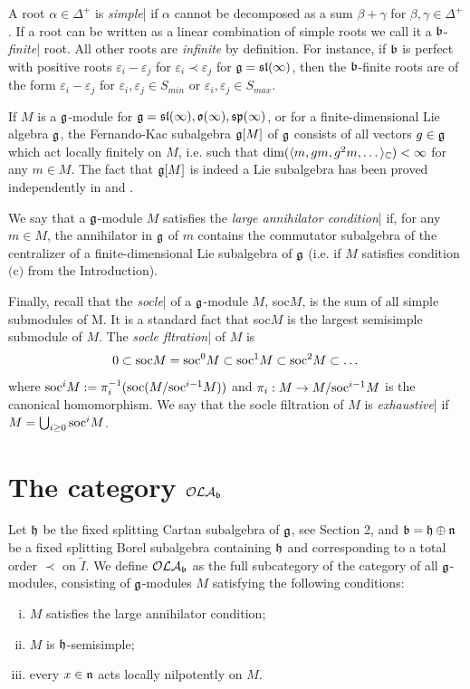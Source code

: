 \documentclass[12pt]{amsart}
\makeatletter
\def\mathbb{\Bbb}
\def\mathfrak{\frak}
\def\emph#1{{\em #1}}
\def\mathcal{\cal}
\def\@putname#1#2#3#4{\def\@@ref{#3}\let\old@bf\bf
        \def\bf##1{\old@bf\if?\noexpand##1?{#4}\else##1\fi}%
        #1{#2}%
        \let\bf\old@bf}
\def\@putname#1#2#3#4{\def\@@ref{#3}\let\old@bf\bf    %
        \let\old@reset@font\reset@font                  %
        \def\bf##1{\old@bf\if?\noexpand##1?{#4}\else##1\fi}%
        \def\reset@font##1##2{\old@reset@font##1\if?\noexpand##2?{#4}\else##2\fi}#1{#2}%
        \let\bf\old@bf\let\reset@font\old@reset@font}
\let\my@cite=\cite
\def\cite#1{\@putname\my@cite{#1}{\@citeb}{\tiny\rm\@@ref}}
\theoremstyle{plain} %
\let\emphOrig\emph
\def\eatToBar#1|{}
\def\emphToIndexSLASH#1\/{\index{#1}\eatToBar}
\def\emphToIndexDOTSLASH#1.\/{\emphToIndexSLASH #1\/}
\def\emphAndIndex#1{\emphOrig{#1}{\emphToIndexDOTSLASH #1.\/|}}
\let\emph\emphAndIndex
\numberwithin{equation}{section}
\theoremstyle{definition}
\theoremstyle{remark}
\theoremstyle{plain} %
\newcommand{\fg}{\mathfrak{g}}
\newcommand{\fn}{\mathfrak{n}}
\newcommand{\fb}{\mathfrak{b}}
\newcommand{\fh}{\mathfrak{h}}
\makeatother
\begin{document}
A root $\alpha \in \Delta^+$ is \emph{simple} if $\alpha$ cannot be decomposed as a sum $\beta+\gamma$ for $\beta, \gamma \in \Delta^+$. If  a root  can be written as a linear combination of simple roots we call it a $\mathfrak{b}$-\emph{finite} root. All other roots are {\it infinite} by definition. For instance, if $\fb$ is perfect with positive roots $\varepsilon_i - \varepsilon_j$ for $\varepsilon_i\prec\varepsilon_j$ for $\fg=\mathfrak{sl}{(\infty)}$, then the $\fb$-finite roots are of the form $\varepsilon_i - \varepsilon_j$ for $\varepsilon_i, \varepsilon_j\in S_{min}$ or $\varepsilon_i, \varepsilon_j\in S_{max}$.

If $M$ is a $\fg$-module for $\fg=\mathfrak{sl}{(\infty)}, \mathfrak{o}{(\infty)}, \mathfrak{sp}{(\infty)} $, or for a finite-dimensional Lie algebra $\fg$, the Fernando-Kac subalgebra $\fg[M]$ of $\fg$ consists of all vectors $g\in\fg$ which act locally finitely on $M$, i.e. such that $\textup{dim}(\langle m,g{m},g^2{m},\dots\rangle_\mathbb C)<\infty$ for any $m\in M$. The fact that $\fg[M]$ is indeed a Lie subalgebra has been proved independently in \cite{K} and \cite{Fe}.

We say that a $\fg$-module $M$ satisfies the \emph{large annihilator condition} if, for any $m\in M$, the annihilator in $\fg$ of $m$ contains the  commutator subalgebra of the centralizer of a finite-dimensional Lie subalgebra of $\fg$ (i.e. if $M$ satisfies condition $($c$)$ from the Introduction).


Finally, recall that the \emph{socle}  of a $\fg$-module $M$, soc$M$, is the sum of all simple submodules of M. It is a standard fact that soc$M$ is the largest semisimple submodule of $M$. The \emph{socle fltration} of $M$ is
$$ 0\subset \textup{soc}M=\textup{soc}^0M\subset \textup{soc}^1M\subset\textup{soc}^2M \subset \dots $$
where $ \textup{soc}^iM:=\pi^{-1}_i( \textup{soc}(M/ \textup{soc}^{i-1}M))$ and $\pi_i:M\to M/ \textup{soc}^{i-1}M$ is the canonical homomorphism. We say that the socle filtration of $M$ is \emph{exhaustive} if $M=\bigcup_{i\geq0} \textup{soc}^iM$.





\section{The category $\mathcal{OLA_{\mathfrak b}}$}

Let $\fh$ be the fixed splitting Cartan subalgebra of $\fg$, see Section 2, and $\fb=\fh\oplus\fn$ be a fixed splitting Borel subalgebra containing $\fh$ and corresponding to a total order $\prec$ on $\tilde I$. We define $\mathcal{OLA_{\mathfrak b}}$ as the full subcategory of the category of all $\mathfrak{g}$-modules, consisting of $\fg$-modules $M$ satisfying the following conditions:
\begin{enumerate}[(i)]
\item $M$ satisfies the large annihilator condition;
\item $M$ is $\mathfrak{h}$-semisimple;
\item every $x\in\mathfrak n$ acts locally nilpotently on $M$.
\end{enumerate}
\end{document}
